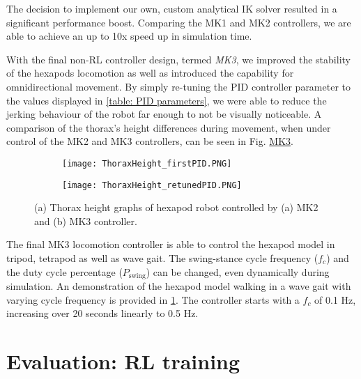 The decision to implement our own, custom analytical IK solver resulted in a significant performance boost.
Comparing the MK1 and MK2 controllers, we are able to achieve an up to 10x speed up in simulation time.

With the final non-RL controller design, termed \textit{MK3}, we improved the stability of the hexapods locomotion as well as introduced the capability for omnidirectional movement.
By simply re-tuning the PID controller parameter to the values displayed in \ref{table: PID parameters}, we were able to reduce the jerking behaviour of the robot far enough to not be visually noticeable.
A comparison of the thorax's height differences during movement, when under control of the MK2 and MK3 controllers, can be seen in Fig. \hyperref[vid: MK1]{MK3}.

\begin{figure}[h]
	\begin{subfigure}{\textwidth} %
		\centering
		\texttt{[image: ThoraxHeight\_firstPID.PNG]}  %
		\caption{}
		\label{figure: Thorax Height graph, bad tuning}
	\end{subfigure}
	
	\begin{subfigure}{\textwidth}
		\centering
		\texttt{[image: ThoraxHeight\_retunedPID.PNG]}   %
		\caption{}
		\label{figure: Thorax height graph, re-tuning}
	\end{subfigure}
	\caption[Thorax height graphs]{(a) Thorax height graphs of hexapod robot controlled by (a) MK2 and (b) MK3 controller.}
	\label{figure: Thorax height graphs}
\end{figure}

The final MK3 locomotion controller is able to control the hexapod model in tripod, tetrapod as well as wave gait.
The swing-stance cycle frequency ($f_c$) and the duty cycle percentage ($P_\text{swing}$) can be changed, even dynamically during simulation.
An demonstration of the hexapod model walking in a wave gait with varying cycle frequency is provided in \ref{}.
The controller starts with a $f_c$ of 0.1 Hz, increasing over 20 seconds linearly to 0.5 Hz.


\section{Evaluation: RL training}

